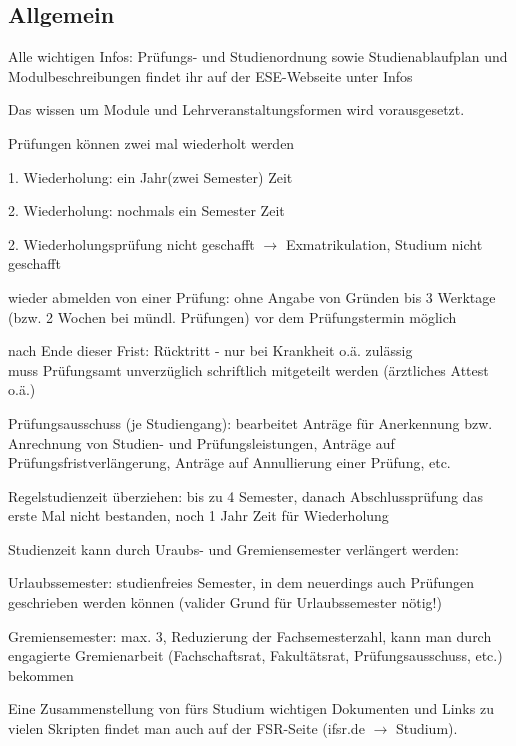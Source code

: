 \documentclass[a4paper,12pt]{report}
\begin{document}
\subsection{Allgemein}
\begin{itemize*}
	\item Alle wichtigen Infos: Prüfungs- und Studienordnung sowie Studienablaufplan und Modulbeschreibungen findet ihr auf der ESE-Webseite unter Infos
	\item Das wissen um Module und Lehrveranstaltungsformen wird vorausgesetzt.
	\item Prüfungen können zwei mal wiederholt werden
		\begin{itemize*}
			\item 1. Wiederholung: ein Jahr(zwei Semester) Zeit
			\item 2. Wiederholung: nochmals ein Semester Zeit
		\end{itemize*}
		2. Wiederholungsprüfung nicht geschafft $\rightarrow$ Exmatrikulation, Studium nicht geschafft
	\item wieder abmelden von einer Prüfung: ohne Angabe von Gründen bis 3 Werktage (bzw. 2 Wochen bei mündl. Prüfungen) vor dem Prüfungstermin möglich
	\item nach Ende dieser Frist: Rücktritt - nur bei Krankheit o.ä. zulässig\\ 
		muss Prüfungsamt unverzüglich schriftlich mitgeteilt werden (ärztliches Attest o.ä.)
	\item Prüfungsausschuss (je Studiengang): bearbeitet Anträge für Anerkennung bzw. Anrechnung von Studien- und Prüfungsleistungen, Anträge auf Prüfungsfristverlängerung, Anträge auf Annullierung einer Prüfung, etc.
	\item Regelstudienzeit überziehen: bis zu 4 Semester, danach Abschlussprüfung das erste Mal nicht bestanden, noch 1 Jahr Zeit für Wiederholung
	\item Studienzeit kann durch Uraubs- und Gremiensemester verlängert werden:
		\begin{itemize*}
			\item Urlaubssemester: studienfreies Semester, in dem neuerdings auch Prüfungen geschrieben werden können (valider Grund für Urlaubssemester nötig!)
			\item Gremiensemester: max. 3, Reduzierung der Fachsemesterzahl, kann man durch engagierte Gremienarbeit (Fachschaftsrat, Fakultätsrat, Prüfungsausschuss, etc.) bekommen
		\end{itemize*}	
\end{itemize*}
Eine Zusammenstellung von fürs Studium wichtigen Dokumenten und Links zu vielen Skripten findet man auch auf der FSR-Seite (ifsr.de $\rightarrow$ Studium).
\end{document}
